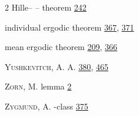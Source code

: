 \begin{multicols}{2}
\hspace*{1.1em}Hille-- -- theorem \hyperlink{page.242}{242}\par
\hspace*{1.1em}individual ergodic theorem \hyperlink{page.367}{367}, \hyperlink{page.371}{371}\par
\hspace*{1.1em}mean ergodic theorem \hyperlink{page.209}{209}, \hyperlink{page.366}{366}\par
\noindent \textsc{Yushkevitch}, A. A. \hyperlink{page.380}{380}, \hyperlink{page.465}{465}\par
\noindent \textsc{Zorn}, M. lemma \hyperlink{page.2}{2}\par
\noindent \textsc{Zygmund}, A. -class \hyperlink{page.375}{375}\par
\end{multicols}
